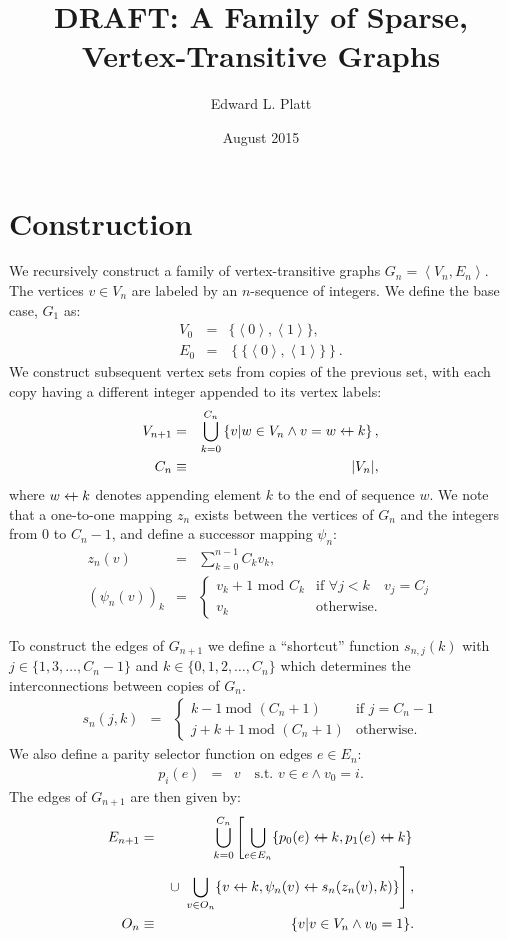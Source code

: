 \documentclass{article}
\title{DRAFT: A Family of Sparse, Vertex-Transitive Graphs}
\author{Edward L. Platt}
\date{August 2015}
\newcommand{\la}{\left\langle}
\newcommand{\ra}{\right\rangle}
\newcommand{\beq}{\begin{eqnarray}}
\newcommand{\eeq}{\end{eqnarray}}
\newcommand{\append}{\leftarrow{\mkern-18mu}{+}\:}
\begin{document}
\maketitle

\section{Construction}

We recursively construct a family of vertex-transitive graphs
$G_n = \la V_n, E_n \ra$.
The vertices $v \in V_n$ are labeled by an $n$-sequence of integers.
We define the base case, $G_1$ as:
\beq
V_0 &=& \{\la{0}\ra,\la{1}\ra\}, \\
E_0 &=& \left\{\{\la{0}\ra,\la{1}\ra\}\right\}.
\eeq
We construct subsequent vertex sets from copies of the previous set,
with each copy having a different integer appended to its vertex labels:
\beq
\label{eq:vn}
V_{n+1} &=& \bigcup_{k = 0}^{C_n}
\left\{ v | w \in V_n \land v = w \append k \right\},
\\
C_n &\equiv& |V_n|,
\eeq
where $w \append k$ denotes appending element $k$ to the end of sequence $w$.
We note that a one-to-one mapping $z_n$ exists between the vertices of $G_n$ and the
integers from $0$ to $C_n - 1$, and define a successor mapping $\psi_n$:
\beq
z_n(v) &=& \sum_{k=0}^{n-1} C_k v_k,
\\
(\psi_n(v))_k
&=&
\begin{cases}
v_k + 1 \mbox{ mod } C_k & \mbox{if } \forall j < k \quad v_j = C_j \\
v_k & \mbox{otherwise}.
\end{cases}
\eeq

To construct the edges of $G_{n+1}$ we define a ``shortcut'' function $s_{n,j}(k)$
with $j \in \{1, 3, \ldots, C_n - 1\}$ and $k \in \{0, 1, 2, \ldots, C_n\}$ which
determines the interconnections between copies of $G_n$.
\beq
s_{n}(j, k)
&=&
\begin{cases}
k - 1 \ \mbox{mod } (C_n + 1)
&
\mbox{if } j = C_n - 1
\\
j + k + 1 \ \mbox{mod } (C_n + 1)
&
\mbox{otherwise}.
\end{cases}
\eeq
We also define a parity selector function on edges $e \in E_n$:
\beq
p_i(e)
&=&
v \quad \mbox{s.t. } v \in e \land v_0 = i.
\eeq
The edges of $G_{n+1}$ are then given by:
\beq
\label{eq:edges}
E_{n+1}
&=&
\bigcup_{k=0}^{C_n}
\left[
\bigcup_{e \in E_n} \{ p_0(e) \append k, p_1(e) \append k\}
\right.
\\ & &
\left.
\cup \ 
\bigcup_{v \in O_n} \{ v \append k, \psi_n(v) \append s_n(z_n(v), k) \}
\right],
\\
O_n &\equiv& \{v | v \in V_n \land v_0 = 1 \}.
\eeq
\end{document}

